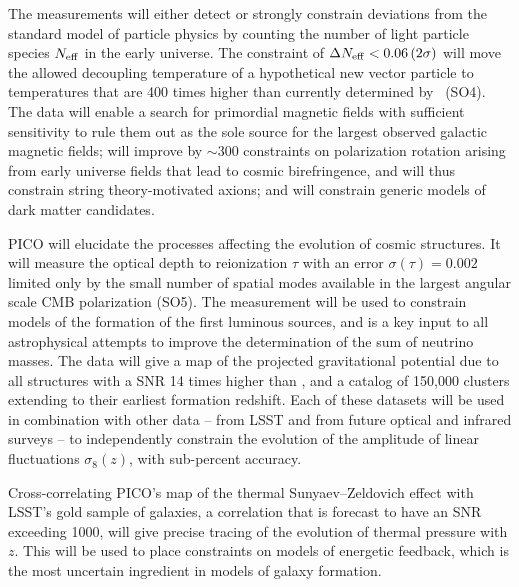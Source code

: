 \documentclass[PICOReport.tex]{subfiles}
\begin{document}
The measurements will either detect or strongly constrain deviations from the standard model of particle physics by counting the number of light particle species $N_{\rm eff}$ in the early universe.  The constraint of $\Delta N_{\rm eff} < 0.06 \, (2\sigma)$ will move the allowed decoupling temperature of a hypothetical new vector particle to temperatures that are 400 times higher than currently determined by \planck\ (SO4). 
The data will enable a search for primordial magnetic fields with sufficient sensitivity to rule them out as the sole source for the largest observed galactic magnetic fields; will improve by $\sim$300 constraints on polarization rotation arising from early universe fields that lead to cosmic birefringence, and will thus constrain string theory-motivated axions; and will constrain generic models of dark matter candidates. 

PICO will elucidate the processes affecting the evolution of cosmic structures. It will measure the optical depth to reionization $\tau$ with an error $\sigma(\tau) = 0.002$ limited only by the small number of spatial modes available in the largest angular scale CMB polarization (SO5). The measurement will be used to constrain models of the formation of the first luminous sources, and is a key input to all astrophysical attempts to improve the determination of the sum of neutrino masses. The data will give a map of the projected gravitational potential due to all structures with a \ac{SNR} 14 times higher than \planck , and a catalog of 150,000 clusters extending to their earliest formation redshift. Each of these datasets will be used in combination with other data -- from LSST and from future optical and infrared surveys -- to independently constrain the evolution of the amplitude of linear fluctuations $\sigma_{8}(z)$, with sub-percent accuracy.  

Cross-correlating PICO's map of the thermal Sunyaev--Zeldovich effect with LSST's gold sample of galaxies, a correlation that is forecast to have an \ac{SNR} exceeding 1000, will give precise tracing of the evolution of thermal pressure with $z$. This will be used to place constraints on models of energetic feedback, which is the most uncertain ingredient in models of galaxy formation. 
\end{document}
